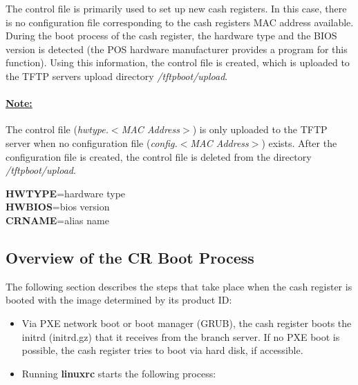 The control file is primarily used to set up new cash registers. In this case,
there is no configuration file corresponding to the cash registers
MAC address available. During the boot process of the cash register, the
hardware type and the BIOS version is detected (the POS
hardware manufacturer provides a program for
this function). Using this information, the control file is created, which is
uploaded to the TFTP servers upload directory \textit{/tftpboot/upload}.

\paragraph{\underline{Note:}}
The control file (\textit{hwtype.$<$MAC Address$>$}) is only uploaded to the
TFTP server when no configuration file (\textit{config.$<$MAC Address$>$})
exists. After the configuration file is created, the control file is deleted
from the directory \textit{/tftpboot/upload}.

\begin{Command}{8cm}
\textbf{HWTYPE}=hardware type \\
\textbf{HWBIOS}=bios version  \\
\textbf{CRNAME}=alias name
\end{Command}

\subsection{Overview of the CR Boot Process}
\label{section:lngovw}

The following section describes the steps that take place when the cash register
is booted with the image determined by its product ID:

\begin{itemize}
\item Via PXE network boot or boot manager (GRUB), the cash register boots the
      initrd (initrd.gz) that it receives from the branch server. If no PXE
      boot is possible, the cash register tries to boot via hard disk, if accessible.
\item Running \textbf{linuxrc} starts the following process:
\end{itemize}

